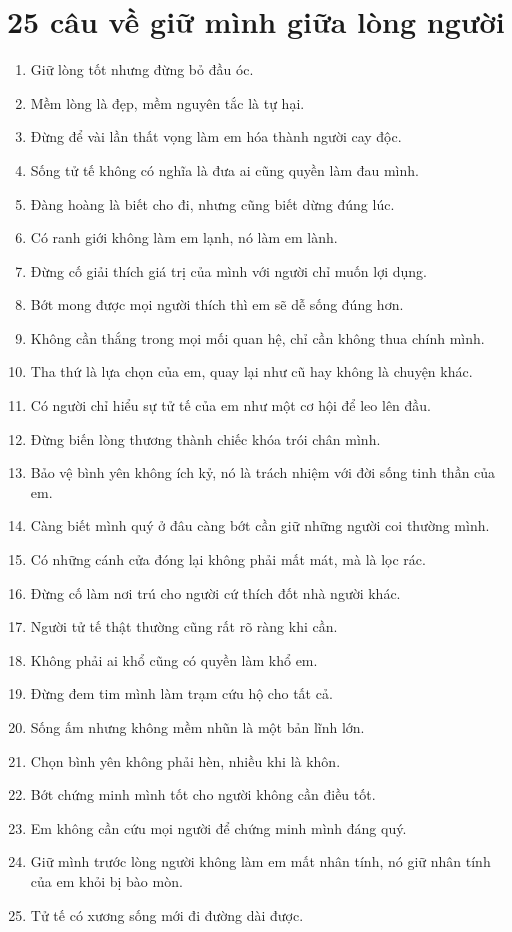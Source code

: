 \section{25 câu về giữ mình giữa lòng người}
\begin{enumerate}[leftmargin=*,resume]
\item Giữ lòng tốt nhưng đừng bỏ đầu óc.
\item Mềm lòng là đẹp, mềm nguyên tắc là tự hại.
\item Đừng để vài lần thất vọng làm em hóa thành người cay độc.
\item Sống tử tế không có nghĩa là đưa ai cũng quyền làm đau mình.
\item Đàng hoàng là biết cho đi, nhưng cũng biết dừng đúng lúc.
\item Có ranh giới không làm em lạnh, nó làm em lành.
\item Đừng cố giải thích giá trị của mình với người chỉ muốn lợi dụng.
\item Bớt mong được mọi người thích thì em sẽ dễ sống đúng hơn.
\item Không cần thắng trong mọi mối quan hệ, chỉ cần không thua chính mình.
\item Tha thứ là lựa chọn của em, quay lại như cũ hay không là chuyện khác.
\item Có người chỉ hiểu sự tử tế của em như một cơ hội để leo lên đầu.
\item Đừng biến lòng thương thành chiếc khóa trói chân mình.
\item Bảo vệ bình yên không ích kỷ, nó là trách nhiệm với đời sống tinh thần của em.
\item Càng biết mình quý ở đâu càng bớt cần giữ những người coi thường mình.
\item Có những cánh cửa đóng lại không phải mất mát, mà là lọc rác.
\item Đừng cố làm nơi trú cho người cứ thích đốt nhà người khác.
\item Người tử tế thật thường cũng rất rõ ràng khi cần.
\item Không phải ai khổ cũng có quyền làm khổ em.
\item Đừng đem tim mình làm trạm cứu hộ cho tất cả.
\item Sống ấm nhưng không mềm nhũn là một bản lĩnh lớn.
\item Chọn bình yên không phải hèn, nhiều khi là khôn.
\item Bớt chứng minh mình tốt cho người không cần điều tốt.
\item Em không cần cứu mọi người để chứng minh mình đáng quý.
\item Giữ mình trước lòng người không làm em mất nhân tính, nó giữ nhân tính của em khỏi bị bào mòn.
\item Tử tế có xương sống mới đi đường dài được.
\end{enumerate}


